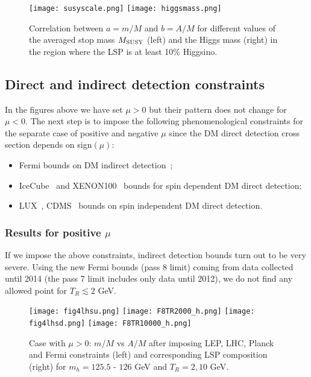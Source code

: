 \documentclass[11pt,a4paper]{article}
\newcommand{\bi}{\begin{itemize}}
\newcommand{\ei}{\end{itemize}}
\begin{document}
\begin{figure}[!ht]
\centering
\texttt{[image: susyscale.png]}
\texttt{[image: higgsmass.png]}
\caption{Correlation between $a=m/M$ and $b=A/M$ for different values of the averaged stop mass $M_{\rm SUSY}$ (left) and the Higgs mass (right)
in the region where the LSP is at least 10\% Higgsino.}
\label{Fig5}
\end{figure}

\subsection{Direct and indirect detection constraints}

In the figures above we have set $\mu>0$ but their pattern does not change for $\mu<0$. The next step is to impose the following phenomenological constraints for the separate case of positive and negative $\mu$ since the DM direct detection cross section depends on sign$(\mu)$:
\bi
\item Fermi bounds on DM indirect detection~\cite{fermi};
\item IceCube~\cite{icecube} and XENON100~\cite{xenon} bounds for spin dependent DM direct detection;
\item LUX~\cite{lux}, CDMS~\cite{cdms} bounds on spin independent DM direct detection.
\ei


\subsubsection{Results for positive $\mu$}

If we impose the above constraints, indirect detection bounds turn out to be very severe. 
Using the new Fermi bounds (pass 8 limit)
coming from data collected until 2014 (the pass 7 limit includes only data until 2012), we do not find any allowed point for $T_R\lesssim 2$ GeV.

\begin{figure}[!ht]
\centering
\texttt{[image: fig4lhsu.png]}
\texttt{[image: F8TR2000\_h.png]}
\texttt{[image: fig4lhsd.png]}
\texttt{[image: F8TR10000\_h.png]}
\caption{Case with $\mu>0$: $m/M$ vs $A/M$ after imposing LEP, LHC, Planck and Fermi constraints (left)
and corresponding LSP composition (right) for $m_h = 125.5$ - $126$ GeV and $T_R = 2, 10$ GeV.}
\label{Fig6}
\end{figure}
\end{document}
